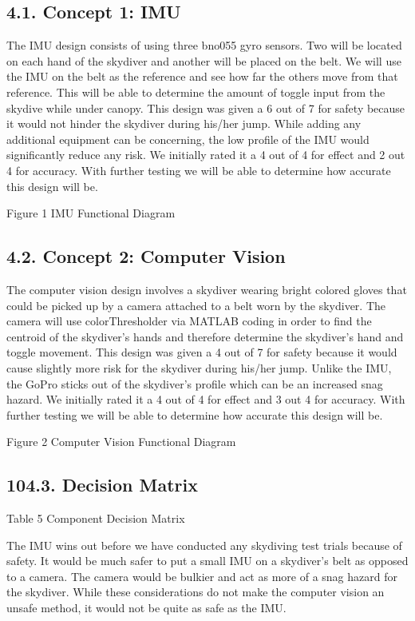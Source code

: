 \documentclass[10pt]{article}
\begin{document}
\subsection{4.1. Concept 1: IMU}
The IMU design consists of using three bno055 gyro sensors. Two will be located on each hand of the skydiver and another will be placed on the belt. We will use the IMU on the belt as the reference and see how far the others move from that reference. This will be able to determine the amount of toggle input from the skydive while under canopy. This design was given a 6 out of 7 for safety because it would not hinder the skydiver during his/her jump. While adding any additional equipment can be concerning, the low profile of the IMU would significantly reduce any risk. We initially rated it a 4 out of 4 for effect and 2 out 4 for accuracy. With further testing we will be able to determine how accurate this design will be.

Figure 1 IMU Functional Diagram

\subsection{4.2. Concept 2: Computer Vision}
The computer vision design involves a skydiver wearing bright colored gloves that could be picked up by a camera attached to a belt worn by the skydiver. The camera will use colorThresholder via MATLAB coding in order to find the centroid of the skydiver’s hands and therefore determine the skydiver’s hand and toggle movement. This design was given a 4 out of 7 for safety because it would cause slightly more risk for the skydiver during his/her jump. Unlike the IMU, the GoPro sticks out of the skydiver’s profile which can be an increased snag hazard. We initially rated it a 4 out of 4 for effect and 3 out 4 for accuracy. With further testing we will be able to determine how accurate this design will be.

Figure 2 Computer Vision Functional Diagram

\subsection{104.3. Decision Matrix}

Table 5 Component Decision Matrix

The IMU wins out before we have conducted any skydiving test trials because of safety. It would be much safer to put a small IMU on a skydiver’s belt as opposed to a camera. The camera would be bulkier and act as more of a snag hazard for the skydiver. While these considerations do not make the computer vision an unsafe method, it would not be quite as safe as the IMU.
\end{document}
